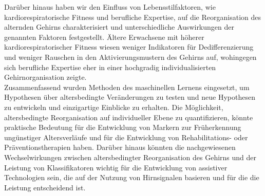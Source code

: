 Darüber hinaus haben wir den Einfluss von Lebensstilfaktoren, wie kardiorespiratorische Fitness und berufliche Expertise, auf die Reorganisation des alternden Gehirns charakterisiert und unterschiedliche Auswirkungen der genannten Faktoren festgestellt. Ältere Erwachsene mit höherer kardiorespiratorischer Fitness wiesen weniger Indikatoren für Dedifferenzierung und weniger Rauschen in den Aktivierungsmustern des Gehirns auf, wohingegen sich berufliche Expertise eher in einer hochgradig individualisierten Gehirnorganisation zeigte.\\
Zusammenfassend wurden Methoden des maschinellen Lernens eingesetzt, um Hypothesen über altersbedingte Veränderungen zu testen und neue Hypothesen zu entwickeln und einzigartige Einblicke zu erhalten. Die Möglichkeit, altersbedingte Reorganisation auf individueller Ebene zu quantifizieren, könnte praktische Bedeutung für die Entwicklung von Markern zur Früherkennung ungünstiger Altersverläufe und für die Entwicklung von Rehabilitations- oder Präventionstherapien haben. Darüber hinaus könnten die nachgewiesenen Wechselwirkungen zwischen altersbedingter Reorganisation des Gehirns und der Leistung von Klassifikatoren wichtig für die Entwicklung von assistiver Technologien sein, die auf der Nutzung von Hirnsignalen basieren und für die die Leistung entscheidend ist.


